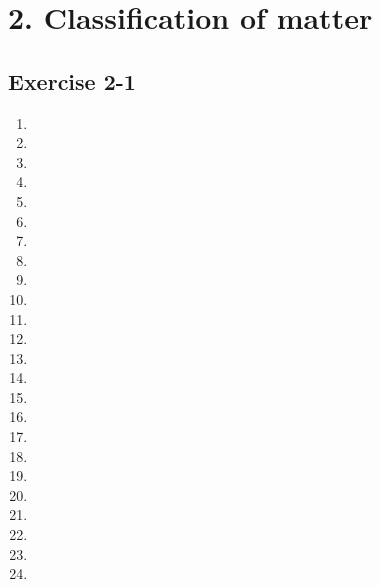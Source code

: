 \section {2. Classification of matter}
\subsection{Exercise 2-1} %

\begin{multicols}{2}
\begin{enumerate}[itemsep=6pt, label=\textbf{\arabic*}. ] 
\item %
\item %
\item %
\item %
\item %
\item %
\item %
\item %
\item %
\item %
\item %
\item %
\item %
\item %
\item %
\item %
\item %
\item %
\item %
\item %
\item %
\item %
\item %
\item %
  
\end{enumerate}
\end{multicols}

